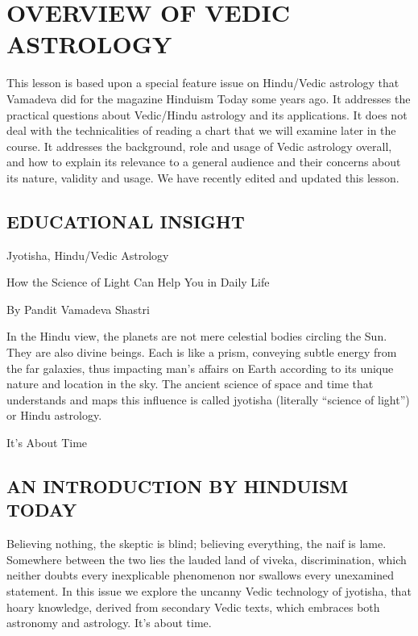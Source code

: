 \section{OVERVIEW OF VEDIC ASTROLOGY}
 

This lesson is based upon a special feature issue on Hindu/Vedic astrology that Vamadeva did for the magazine Hinduism Today some years ago. It addresses the practical questions about Vedic/Hindu astrology and its applications. It does not deal with the technicalities of reading a chart that we will examine later in the course. It addresses the background, role and usage of Vedic astrology overall, and how to explain its relevance to a general audience and their concerns about its nature, validity and usage. We have recently edited and updated this lesson.

 



\subsection{EDUCATIONAL INSIGHT}
Jyotisha, Hindu/Vedic Astrology

How the Science of Light Can Help You in Daily Life

By Pandit Vamadeva Shastri

 

In the Hindu view, the planets are not mere celestial bodies circling the Sun. They are also divine beings. Each is like a prism, conveying subtle energy from the far galaxies, thus impacting man’s affairs on Earth according to its unique nature and location in the sky. The ancient science of space and time that understands and maps this influence is called jyotisha (literally “science of light”) or Hindu astrology. 

 

It’s About Time

\subsection{AN INTRODUCTION BY HINDUISM TODAY}

Believing nothing, the skeptic is blind; believing everything, the naif is lame. Somewhere between the two lies the lauded land of viveka, discrimination, which neither doubts every inexplicable phenomenon nor swallows every unexamined statement. In this issue we explore the uncanny Vedic technology of jyotisha, that hoary knowledge, derived from secondary Vedic texts, which embraces both astronomy and astrology. It’s about time.

